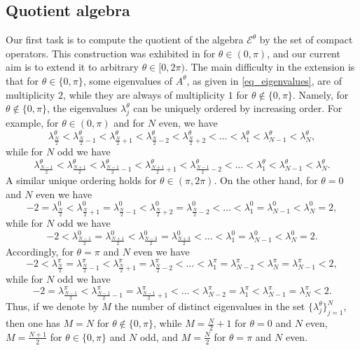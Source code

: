 \documentclass[11pt]{article}
\def\EE{\mathscr E}
\begin{document}
\subsection{Quotient algebra}

Our first task is to compute the quotient of the algebra $\EE^\theta$ by the set of compact operators. This construction was exhibited in \cite[Sec.~3]{APRR} for $\theta \in (0,\pi)$, and our current aim is to extend it to arbitrary $\theta \in [0,2\pi)$. The main difficulty in the extension is that for $\theta\in \{0,\pi\}$, some eigenvalues of $A^\theta$, as given in \eqref{eq_eigenvalues},
are of multiplicity $2$, while they are always of multiplicity $1$ for $\theta\not \in \{0,\pi\}$.
Namely, for $\theta \not \in \{0,\pi\}$, the eigenvalues $\lambda^\theta_j$ can be uniquely ordered by increasing order. For example, for $\theta\in (0,\pi)$ and for $N$ even, we have
$$
\lambda^\theta_{\frac{N}{2}}<\lambda^\theta_{\frac{N}{2}-1}<\lambda^\theta_{\frac{N}{2}+1}<\lambda^\theta_{\frac{N}{2}-2}<\lambda^\theta_{\frac{N}{2}+2}<\ldots < \lambda^\theta_1<\lambda^\theta_{N-1}<\lambda^\theta_{N},
$$
while for $N$ odd we have
$$
\lambda^\theta_{\frac{N-1}{2}}<\lambda^\theta_{\frac{N+1}{2}}<\lambda^\theta_{\frac{N-1}{2}-1}<\lambda^\theta_{\frac{N+1}{2}+1}<\lambda^\theta_{\frac{N-1}{2}-2}<\ldots<\lambda^\theta_1<\lambda^\theta_{N-1}<\lambda^\theta_{N}.
$$
A similar unique ordering holds for $\theta \in (\pi,2\pi)$. On the other hand, for $\theta=0$ and $N$ even we have
$$
-2=\lambda^0_{\frac{N}{2}}<\lambda^0_{\frac{N}{2}+1}=\lambda^0_{\frac{N}{2}-1}<\lambda^0_{\frac{N}{2}+2}=\lambda^0_{\frac{N}{2}-2}<\ldots<\lambda_1^0=\lambda^0_{N-1}<\lambda^0_{N}=2,
$$
while for $N$ odd we have
$$
-2<\lambda^0_{\frac{N-1}{2}}=\lambda^0_{\frac{N+1}{2}}<\lambda^0_{\frac{N-3}{2}}=\lambda^0_{\frac{N+3}{2}}<\ldots<\lambda_1^0=\lambda^0_{N-1}<\lambda^0_{N}=2.
$$
Accordingly, for $\theta=\pi$ and $N$ even we have
$$
-2<\lambda^\pi_{\frac{N}{2}}=\lambda^\pi_{\frac{N}{2}-1}<\lambda^\pi_{\frac{N}{2}+1}=\lambda^\pi_{\frac{N}{2}-2}<\ldots<\lambda_1^\pi=\lambda^\pi_{N-2}<\lambda^\pi_{N}=\lambda^\pi_{N-1}<2,
$$
while for $N$ odd we have
$$
-2=\lambda^\pi_{\frac{N-1}{2}}<\lambda^\pi_{\frac{N-1}{2}-1}=\lambda^\pi_{\frac{N-1}{2}+1}<\ldots<\lambda^\pi_{N-2}=\lambda_1^\pi<\lambda^\pi_{N-1}=\lambda^\pi_{N}<2.
$$
Thus, if we denote by $M$ the number of distinct eigenvalues in the set
$\{\lambda^\theta_j\}_{j=1}^N$, then one has
$M=N$ for $\theta \not \in \{0,\pi\}$, while $M= \frac{N}{2}+1$ for $\theta=0$ and $N$ even, 
$M=\frac{N+1}{2}$ for $\theta \in \{0,\pi\}$ and $N$ odd, and $M= \frac{N}{2}$ for $\theta=\pi$ and $N$ even. 
\end{document}
